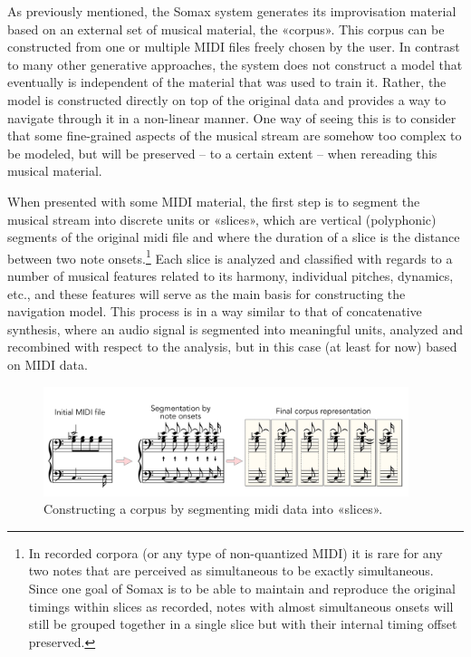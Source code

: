 As previously mentioned, the Somax system generates its improvisation material based on an external set of musical material, the «corpus». This corpus can be constructed from one or multiple MIDI files freely chosen by the user. In contrast to many other generative approaches, the system does not construct a model that eventually is independent of the material that was used to train it. Rather, the model is constructed directly on top of the original data and provides a way to navigate through it in a non-linear manner. One way of seeing this is to consider that some fine-grained aspects of the musical stream are somehow too complex to be modeled, but will be preserved – to a certain extent – when rereading this musical material.

When presented with some MIDI material, the first step is to segment the musical stream into discrete units or «slices», which are vertical (polyphonic) segments of the original midi file and where the duration of a slice is the distance between two note onsets.\footnote{In recorded corpora (or any type of non-quantized MIDI) it is rare for any two notes that are perceived as simultaneous to be exactly simultaneous. Since one goal of Somax is to be able to maintain and reproduce the original timings within slices as recorded, notes with almost simultaneous onsets will still be grouped together in a single slice but with their internal timing offset preserved.} Each slice is analyzed and classified with regards to a number of musical features related to its harmony, individual pitches, dynamics, etc., and these features will serve as the main basis for constructing the navigation model. This process is in a way similar to that of concatenative synthesis, where an audio signal is segmented into meaningful units, analyzed and recombined with respect to the analysis, but  in this case (at least for now) based on MIDI data.

 \begin{figure}[h!]
    \centering        
 	\includegraphics[width=0.95\textwidth]{img/segmentation.png}
    \caption{Constructing a corpus by segmenting midi data into «slices».}
\end{figure}

